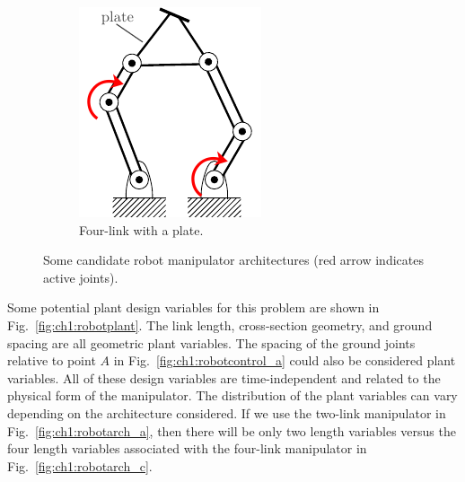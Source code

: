 \begin{figure}
\begin{subfigure}[t]{0.31\textwidth}
	\includegraphics[scale=1]{../ch1/figures/robotarch_d.pdf}
    \caption{Four-link with a plate.\label{fig:ch1:robotarch_d}}
\end{subfigure}%
\caption[Some candidate robot manipulator architectures]{Some candidate robot manipulator architectures (red arrow indicates active joints).\label{fig:ch1:robotarch}}
\end{figure}

Some potential plant design variables for this problem are shown in Fig.~\ref{fig:ch1:robotplant}.
The link length, cross-section geometry, and ground spacing are all geometric plant variables.
The spacing of the ground joints relative to point $A$ in Fig.~\ref{fig:ch1:robotcontrol_a} could also be considered plant variables.
All of these design variables are time-independent and related to the physical form of the manipulator.
The distribution of the plant variables can vary depending on the architecture considered.
If we use the two-link manipulator in Fig.~\ref{fig:ch1:robotarch_a}, then there will be only two length variables versus the four length variables associated with the four-link manipulator in Fig.~\ref{fig:ch1:robotarch_c}.

